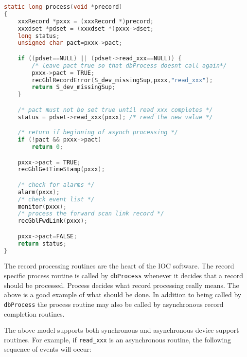 \begin{lstlisting}[language=C]
static long process(void *precord)
{
    xxxRecord *pxxx = (xxxRecord *)precord;
    xxxdset *pdset = (xxxdset *)pxxx->dset;
    long status;
    unsigned char pact=pxxx->pact;

    if ((pdset==NULL) || (pdset->read_xxx==NULL)) {
        /* leave pact true so that dbProcess doesnt call again*/
        pxxx->pact = TRUE;
        recGblRecordError(S_dev_missingSup,pxxx,"read_xxx");
        return S_dev_missingSup;
    }

    /* pact must not be set true until read_xxx completes */
    status = pdset->read_xxx(pxxx); /* read the new value */

    /* return if beginning of asynch processing */
    if (!pact && pxxx->pact)
        return 0;

    pxxx->pact = TRUE;
    recGblGetTimeStamp(pxxx);

    /* check for alarms */
    alarm(pxxx);
    /* check event list */
    monitor(pxxx);
    /* process the forward scan link record */
    recGblFwdLink(pxxx);

    pxxx->pact=FALSE;
    return status;
}
\end{lstlisting}

The record processing routines are the heart of the IOC software.
The record specific process routine is called by \verb|dbProcess| whenever it decides that a record should be processed.
Process decides what record processing really means.
The above is a good example of what should be done.
In addition to being called by \verb|dbProcess| the process routine may also be called by asynchronous record completion routines.

The above model supports both synchronous and asynchronous device support routines.
For example, if \verb|read_xxx| is an asynchronous routine, the following sequence of events will occur:

